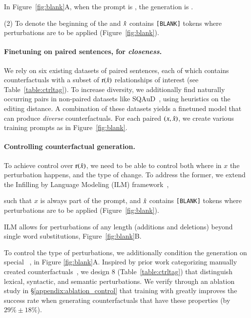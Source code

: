 In Figure~\ref{fig:blank}A, when the prompt is , the generation is \exinline{\ctrltag{[code]} $\xp$}.

(2) To denote the beginning of the 
and $\xp$ contains \texttt{[BLANK]} tokens where perturbations are to be applied (Figure~\ref{fig:blank}). 

\paragraph{Finetuning on paired sentences, for \emph{closeness}.}
We rely on six existing datasets of paired sentences, each of which contains counterfactuals with a subset of $\operatorname*{r}(\hat{x})$ relationships of interest (see Table~\ref{table:ctrltag}). 
To increase diversity, we additionally find naturally occurring pairs in non-paired datasets like SQAuD~\cite{rajpurkar-etal-2016-squad}, using heuristics on the editing distance. 
A combination of these datasets yields a finetuned model that can produce \emph{diverse} counterfactuals.
For each paired $(x, \hat{x})$, we create various training prompts as in Figure~\ref{fig:blank}.



\paragraph{Controlling counterfactual generation.}
To achieve control over $\operatorname*{r}(\hat{x})$, we need to be able to control both where in $x$ the perturbation happens, and the type of change. To address the former, 
we extend the Infilling by Language Modeling (ILM) framework~\cite{donahue2020enabling}, 

such that $x$ is always part of the prompt, and $\xp$ contains \texttt{[BLANK]} tokens where perturbations are to be applied (Figure~\ref{fig:blank}). 

ILM allows for perturbations of any length (additions and deletions) beyond single word substitutions, \eg Figure~\ref{fig:blank}B.

To control the type of perturbations, we additionally condition the generation on special \tagstrs~\cite{raffel2019exploring, Dathathri2020Plug}, \eg {} in Figure \ref{fig:blank}A.
Inspired by prior work categorizing manually created counterfactuals~\cite{kaushik2019learning, gardner2020contrast}, we design 8 \tagstrshorts (Table~\ref{table:ctrltag}) that distinguish lexical, syntactic, and semantic perturbations. 
We verify through an ablation study in \S\ref{appendix:ablation_control} that training \sysname with \tagstrs greatly improves the success rate when generating counterfactuals that have these properties (by $29\% \pm 18\%$). 













